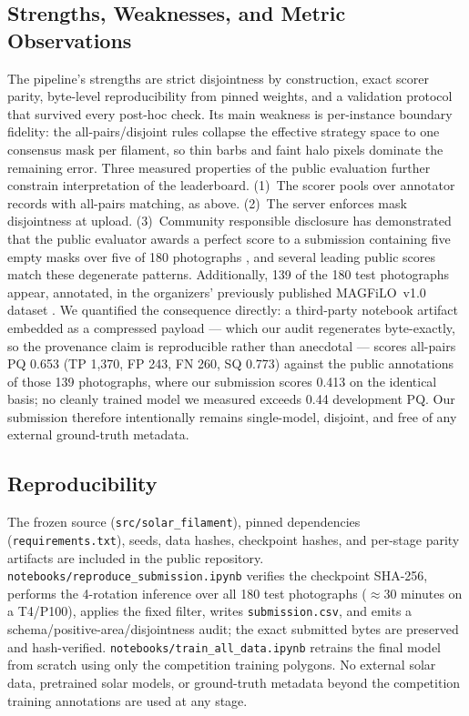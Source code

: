 \documentclass[sigconf]{acmart}
\begin{document}
\subsection{Strengths, Weaknesses, and Metric Observations}
The pipeline's strengths are strict disjointness by construction, exact scorer parity, byte-level reproducibility from pinned weights, and a validation protocol that survived every post-hoc check.
Its main weakness is per-instance boundary fidelity: the all-pairs/disjoint rules collapse the effective strategy space to one consensus mask per filament, so thin barbs and faint halo pixels dominate the remaining error.
Three measured properties of the public evaluation further constrain interpretation of the leaderboard.
(1)~The scorer pools over annotator records with all-pairs matching, as above.
(2)~The server enforces mask disjointness at upload.
(3)~Community responsible disclosure has demonstrated that the public evaluator awards a perfect score to a submission containing five empty masks over five of 180 photographs \cite{pleasefixlb}, and several leading public scores match these degenerate patterns.
Additionally, 139 of the 180 test photographs appear, annotated, in the organizers' previously published MAGFiLO~v1.0 dataset \cite{ahmadzadeh2024dataset}.
We quantified the consequence directly: a third-party notebook artifact embedded as a compressed payload --- which our audit regenerates byte-exactly, so the provenance claim is reproducible rather than anecdotal --- scores all-pairs PQ 0.653 (TP 1{,}370, FP 243, FN 260, SQ 0.773) against the public annotations of those 139 photographs, where our submission scores 0.413 on the identical basis; no cleanly trained model we measured exceeds 0.44 development PQ.
Our submission therefore intentionally remains single-model, disjoint, and free of any external ground-truth metadata.

\subsection{Reproducibility}
The frozen source (\texttt{src/solar\_filament}), pinned dependencies (\texttt{requirements.txt}), seeds, data hashes, checkpoint hashes, and per-stage parity artifacts are included in the public repository.
\texttt{notebooks/reproduce\_submission.ipynb} verifies the checkpoint SHA-256, performs the 4-rotation inference over all 180 test photographs ($\approx$30 minutes on a T4/P100), applies the fixed filter, writes \texttt{submission.csv}, and emits a schema/positive-area/disjointness audit; the exact submitted bytes are preserved and hash-verified.
\texttt{notebooks/train\_all\_data.ipynb} retrains the final model from scratch using only the competition training polygons.
No external solar data, pretrained solar models, or ground-truth metadata beyond the competition training annotations are used at any stage.
\end{document}
